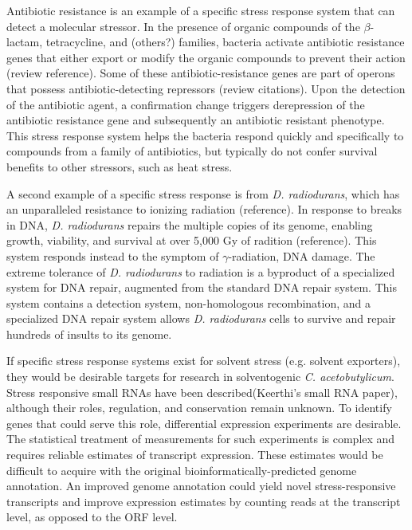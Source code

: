 Antibiotic resistance is an example of a specific stress response system that can detect a molecular stressor. In the presence of organic compounds of the $\beta$-lactam, tetracycline, and (others?) families, bacteria activate antibiotic resistance genes that either export or modify the organic compounds to prevent their action (review reference). Some of these antibiotic-resistance genes are part of operons that possess antibiotic-detecting repressors (review citations). Upon the detection of the antibiotic agent, a confirmation change triggers derepression of the antibiotic resistance gene and subsequently an antibiotic resistant phenotype. This stress response system helps the bacteria respond quickly and specifically to compounds from a family of antibiotics, but typically do not confer survival benefits to other stressors, such as heat stress.

A second example of a specific stress response is from \textit{D. radiodurans}, which has an unparalleled resistance to ionizing radiation (reference). In response to breaks in DNA, \textit{D. radiodurans} repairs the multiple copies of its genome, enabling growth, viability, and survival at over 5,000 Gy of radition (reference). This system responds instead to the symptom of $\gamma$-radiation, DNA damage. The extreme tolerance of \textit{D. radiodurans} to radiation is a byproduct of a specialized system for DNA repair, augmented from the standard DNA repair system. This system contains a detection system, non-homologous recombination, and a specialized DNA repair system allows \textit{D. radiodurans} cells to survive and repair hundreds of insults to its genome. 

If specific stress response systems exist for solvent stress (e.g. solvent exporters), they would be desirable targets for research in solventogenic \textit{C. acetobutylicum}. Stress responsive small RNAs have been described(Keerthi's small RNA paper), although their roles, regulation, and conservation remain unknown. To identify genes that could serve this role, differential expression experiments are desirable. The statistical treatment of measurements for such experiments is complex and requires reliable estimates of transcript expression. These estimates would be difficult to acquire with the original bioinformatically-predicted genome annotation. An improved genome annotation could yield novel stress-responsive transcripts and improve expression estimates by counting reads at the transcript level, as opposed to the ORF level.

